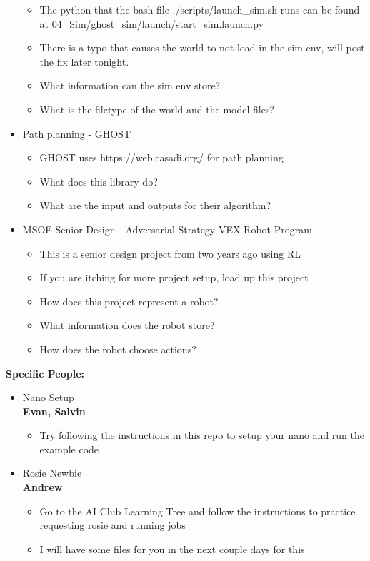 \begin{itemize}
\begin{itemize}
      \item The python that the bash file ./scripts/launch\_sim.sh runs can be found at 04\_Sim/ghost\_sim/launch/start\_sim.launch.py
      \item There is a typo that causes the world to not load in the sim env, will post the fix later tonight.
      \item What information can the sim env store?
      \item What is the filetype of the world and the model files?
  \end{itemize}
  \item Path planning - GHOST
  \begin{itemize}
      \item GHOST uses https://web.casadi.org/ for path planning
      \item What does this library do?
      \item What are the input and outputs for their algorithm?
  \end{itemize}
  \item MSOE Senior Design - Adversarial Strategy VEX Robot Program
  \begin{itemize}
      \item This is a senior design project from two years ago using RL 
      \item If you are itching for more project setup, load up this project
      \item How does this project represent a robot?
      \item What information does the robot store?
      \item How does the robot choose actions?
  \end{itemize}
\end{itemize}
\textbf{Specific People:}
\begin{itemize}
  \item Nano Setup\\
  \textbf{Evan, Salvin}
  \begin{itemize}
    \item Try following the instructions in this repo to setup your nano and run the example code
  \end{itemize}
  \item Rosie Newbie\\
  \textbf{Andrew}
  \begin{itemize}
    \item Go to the AI Club Learning Tree and follow the instructions to practice requesting rosie and running jobs
    \item I will have some files for you in the next couple days for this
  \end{itemize}
\end{itemize}

